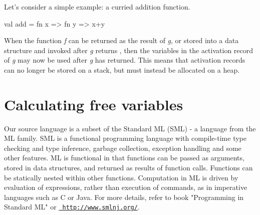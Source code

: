 \documentclass{article}
\theoremstyle{definition}
\theoremstyle{remark}
\numberwithin{equation}{section}
\begin{document}
Let's consider a simple example: a curried addition function.

\begin{code}
val add = fn x => fn y => x+y
\end{code}

When the function \emph{f} can be returned as the result of \emph{g},
or stored into a data structure and invoked after \emph{g} returns
, then the variables in the activation record of \emph{g}
may now be used after \emph{g} has returned. This means that activation records
can no longer be stored on a stack, but must instead be allocated on a heap.

\section{Calculating free variables}

Our source language is a subset of the Standard ML (SML) - a language
from the ML family. SML is a functional programming language with
 compile-time type checking and type inference, garbage collection,
 exception handling and some other features. ML is functional in that
 functions can be passed as arguments, stored in data structures, and
returned as results of function calls. Functions can be statically
nested within other functions. Computation in ML is driven by
evaluation of expressions, rather than execution of commands, as in
imperative languages such as C or Java. For more details, refer to
book "Programming in Standard ML" or \href{http://www.smlnj.org/}
{\texttt{ http://www.smlnj.org/}}.
\end{document}
